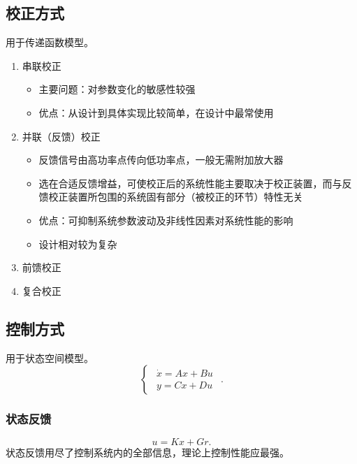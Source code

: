 \documentclass[14pt,a4paper]{article}
\theoremstyle{plain}
\theoremstyle{definition}
\theoremstyle{remark}
\theoremstyle{plain}
\theoremstyle{plain}
\theoremstyle{plain}
\theoremstyle{definition}
\theoremstyle{remark}
\numberwithin{equation}{section}
\begin{document}
		\subsection{校正方式}%
		\label{sub:校正方式}

			用于传递函数模型。
			\begin{enumerate}
				\item 串联校正
					\begin{itemize}
						\item 主要问题：对参数变化的敏感性较强
						\item 优点：从设计到具体实现比较简单，在设计中最常使用
					\end{itemize}
				\item 并联（反馈）校正
					\begin{itemize}
						\item 反馈信号由高功率点传向低功率点，一般无需附加放大器
						\item 选在合适反馈增益，可使校正后的系统性能主要取决于校正装置，而与反馈校正装置所包围的系统固有部分（被校正的环节）特性无关
						\item 优点：可抑制系统参数波动及非线性因素对系统性能的影响
						\item 设计相对较为复杂
					\end{itemize}
				\item 前馈校正
				\item 复合校正
			\end{enumerate}
			
		\subsection{控制方式}%
		\label{sub:控制方式0}

			用于状态空间模型。
			\begin{equation*}
			\begin{cases}
				\begin{aligned}
				\dot x = Ax + Bu \\
				y = Cx + Du
				\end{aligned}  
			\end{cases}
			.\end{equation*} 
			
			\subsubsection{状态反馈}%
			\label{ssub:状态反馈}
			
				\[
				u = Kx + Gr	
				.\]
				状态反馈用尽了控制系统内的全部信息，理论上控制性能应最强。
\end{document}
